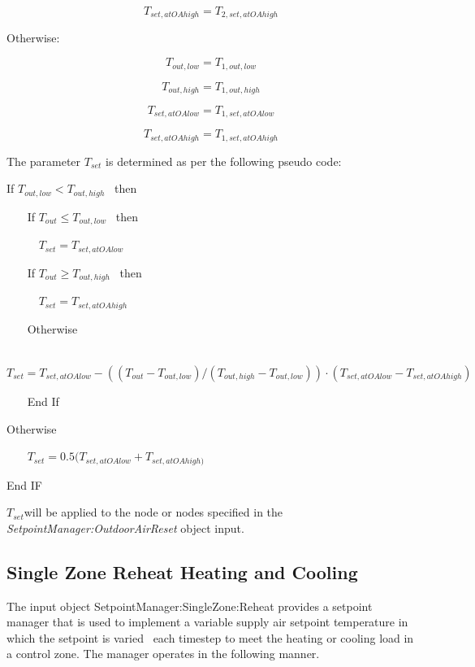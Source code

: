 \begin{equation}
{T_{set,atOAhigh}} = {T_{2,set,atOAhigh}}
\end{equation}

Otherwise:

\begin{equation}
{T_{out,low}} = {T_{1,out,low}}
\end{equation}

\begin{equation}
{T_{out,high}} = {T_{1,out,high}}
\end{equation}

\begin{equation}
{T_{set,atOAlow}} = {T_{1,set,atOAlow}}
\end{equation}

\begin{equation}
{T_{set,atOAhigh}} = {T_{1,set,atOAhigh}}
\end{equation}

The parameter \(T_{set}\) is determined as per the following pseudo code:

If \({T_{out,low}} < {T_{out,high}}\) ~then

~~~ If \({T_{out}} \le {T_{out,low}}\) ~then

~~~~~ \({T_{set}} = {T_{set,atOAlow}}\)

~~~ If \({T_{out}} \ge {T_{out,high}}\) ~then

~~~~~ \({T_{set}} = {T_{set,atOAhigh}}\)

~~~ Otherwise

~~~~~ \({T_{set}} = {T_{set,atOAlow}} - (({T_{out}} - {T_{out,low}})/({T_{out,high}} - {T_{out,low}}))\cdot ({T_{set,atOAlow}} - {T_{set,atOAhigh}})\)

~~~ End If

Otherwise

~~~ \({T_{set}} = 0.5({T_{set,atOAlow}} + {T_{set,atOAhigh)}}\)

End IF

\emph{\({T_{set}}\)}will be applied to the node or nodes specified in the \emph{SetpointManager:OutdoorAirReset} object input.

\subsection{Single Zone Reheat Heating and Cooling}\label{single-zone-reheat-heating-and-cooling}

The input object SetpointManager:SingleZone:Reheat provides a setpoint manager that is used to implement a variable supply air setpoint temperature in which the setpoint is varied~ each timestep to meet the heating or cooling load in a control zone. The manager operates in the following manner.


